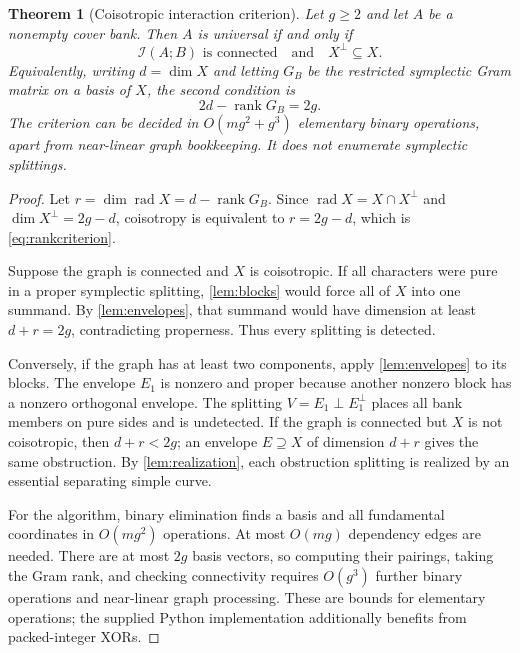 \documentclass[11pt,letterpaper]{article}
\newtheorem{theorem}{Theorem}[section]
\theoremstyle{definition}
\theoremstyle{remark}
\newcommand{\rank}{\operatorname{rank}}
\newcommand{\rad}{\operatorname{rad}}
\begin{document}
\begin{theorem}[Coisotropic interaction criterion]\label{thm:bank}
Let $g\ge2$ and let $A$ be a nonempty cover bank. Then $A$ is universal if and only if
\begin{equation}\label{eq:bankcriterion}
 \mathcal I(A;B)\text{ is connected}
 \quad\text{and}\quad X^\perp\subseteq X.
\end{equation}
Equivalently, writing $d=\dim X$ and letting $G_B$ be the restricted symplectic Gram matrix on a basis of $X$, the second condition is
\begin{equation}\label{eq:rankcriterion}
 2d-\rank G_B=2g.
\end{equation}
The criterion can be decided in $O(mg^2+g^3)$ elementary binary operations, apart from near-linear graph bookkeeping. It does not enumerate symplectic splittings.
\end{theorem}
\begin{proof}
Let $r=\dim\rad X=d-\rank G_B$. Since $\rad X=X\cap X^\perp$ and $\dim X^\perp=2g-d$, coisotropy is equivalent to $r=2g-d$, which is \eqref{eq:rankcriterion}.

Suppose the graph is connected and $X$ is coisotropic. If all characters were pure in a proper symplectic splitting, \cref{lem:blocks} would force all of $X$ into one summand. By \cref{lem:envelopes}, that summand would have dimension at least $d+r=2g$, contradicting properness. Thus every splitting is detected.

Conversely, if the graph has at least two components, apply \cref{lem:envelopes} to its blocks. The envelope $E_1$ is nonzero and proper because another nonzero block has a nonzero orthogonal envelope. The splitting $V=E_1\perp E_1^\perp$ places all bank members on pure sides and is undetected. If the graph is connected but $X$ is not coisotropic, then $d+r<2g$; an envelope $E\supseteq X$ of dimension $d+r$ gives the same obstruction. By \cref{lem:realization}, each obstruction splitting is realized by an essential separating simple curve.

For the algorithm, binary elimination finds a basis and all fundamental coordinates in $O(mg^2)$ operations. At most $O(mg)$ dependency edges are needed. There are at most $2g$ basis vectors, so computing their pairings, taking the Gram rank, and checking connectivity requires $O(g^3)$ further binary operations and near-linear graph processing. These are bounds for elementary operations; the supplied Python implementation additionally benefits from packed-integer XORs.
\end{proof}
\end{document}
